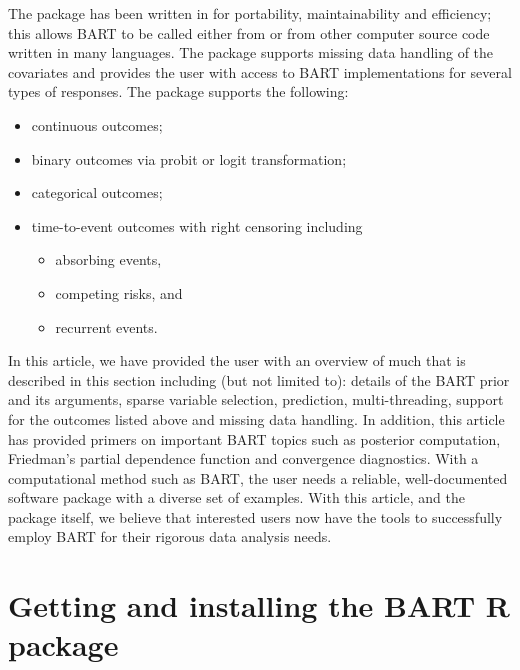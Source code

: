 \documentclass[article]{jss}
\begin{document}
The  package has been written in  for portability,
maintainability and efficiency; this allows BART to be called either
from  or from other computer source code written in many
languages.  The package supports missing data handling of the
covariates and provides the user with access to BART implementations
for several types of responses.  The  package supports the
following:
\begin{itemize}
\item continuous outcomes;
\item binary outcomes via probit or logit transformation;
\item categorical outcomes;
\item time-to-event outcomes with right censoring including
\begin{itemize}
\item absorbing events,
\item competing risks, and
\item recurrent events.
\end{itemize}
\end{itemize}

In this article, we have provided the user with an overview of much
that is described in this section including (but not limited to): details of
the BART prior and its arguments, sparse variable selection,
prediction, multi-threading, support for the outcomes listed above and
missing data handling.  In addition, this article has provided primers
on important BART topics such as posterior computation, Friedman's partial
dependence function and convergence diagnostics.  With a
computational method such as BART, the user needs a reliable,
well-documented software package with a diverse set of examples.  With
this article, and the  package itself, we believe that
interested users now have the tools to successfully employ
BART for their rigorous data analysis needs.

\clearpage
\appendix
\section{Getting and installing the BART R package}\label{BART}
\end{document}
